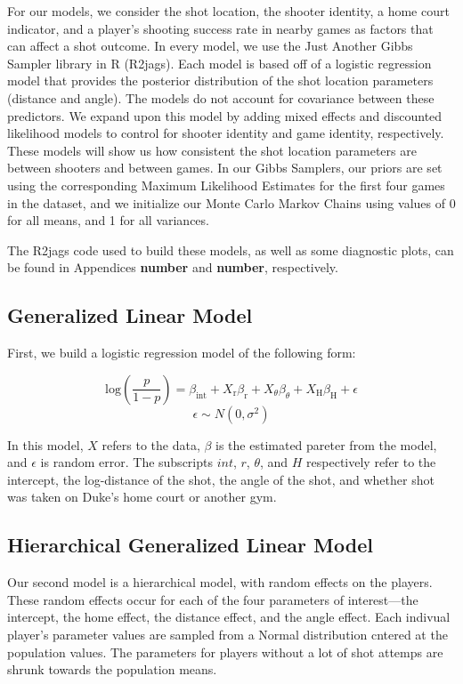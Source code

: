 \documentclass[12pt,twoside]{dukestatscithesis}
\theoremstyle{definition}
\theoremstyle{definition}
\theoremstyle{definition}
\theoremstyle{remark}
\begin{document}
For our models, we consider the shot location, the shooter identity, a
home court indicator, and a player's shooting success rate in nearby
games as factors that can affect a shot outcome. In every model, we use
the Just Another Gibbs Sampler library in R (R2jags). Each model is
based off of a logistic regression model that provides the posterior
distribution of the shot location parameters (distance and angle). The
models do not account for covariance between these predictors. We expand
upon this model by adding mixed effects and discounted likelihood models
to control for shooter identity and game identity, respectively. These
models will show us how consistent the shot location parameters are
between shooters and between games. In our Gibbs Samplers, our priors
are set using the corresponding Maximum Likelihood Estimates for the
first four games in the dataset, and we initialize our Monte Carlo
Markov Chains using values of 0 for all means, and 1 for all variances.

The R2jags code used to build these models, as well as some diagnostic
plots, can be found in Appendices \textbf{number} and \textbf{number},
respectively.

\subsection{Generalized Linear Model}\label{generalized-linear-model}

First, we build a logistic regression model of the following form:

\[
\text{log} \left( \frac{p}{1-p} \right) = 
\beta_{\text{int}} +
X_{\text{r}}\beta_{\text{r}} +
X_{\theta}\beta_{\theta} +
X_{\text{H}}\beta_{\text{H}} +
\epsilon
\] \[
\epsilon \sim N(0, \sigma^2)
\]

In this model, \(X\) refers to the data, \(\beta\) is the estimated
pareter from the model, and \(\epsilon\) is random error. The subscripts
\(\textit{int}\), \(\textit{r}\), \(\theta\), and \(\textit{H}\)
respectively refer to the intercept, the log-distance of the shot, the
angle of the shot, and whether shot was taken on Duke's home court or
another gym.

\subsection{Hierarchical Generalized Linear
Model}\label{hierarchical-generalized-linear-model}

Our second model is a hierarchical model, with random effects on the
players. These random effects occur for each of the four parameters of
interest---the intercept, the home effect, the distance effect, and the
angle effect. Each indivual player's parameter values are sampled from a
Normal distribution cntered at the population values. The parameters for
players without a lot of shot attemps are shrunk towards the population
means.
\end{document}
